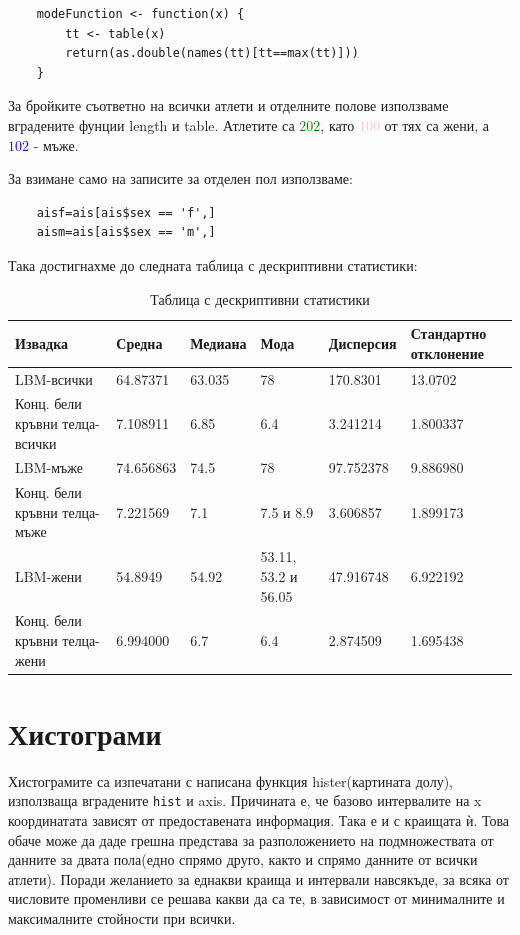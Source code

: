 \documentclass[12pt]{article}
\begin{document}
\begin{large}
\begin{verbatim}
	modeFunction <- function(x) {
		tt <- table(x)
		return(as.double(names(tt)[tt==max(tt)]))
	}
\end{verbatim}

За бройките съответно на всички атлети и отделните полове използваме вградените фунции length и table. Атлетите са \textcolor{green}{$202$}, като \textcolor{pink}{$100$} от тях са жени, а \textcolor{blue}{$102$} - мъже.

За взимане само на записите за отделен пол използваме:
\begin{verbatim}
	aisf=ais[ais$sex == 'f',]
	aism=ais[ais$sex == 'm',]
\end{verbatim}
Така достигнахме до следната таблица с дескриптивни статистики:
\clearpage

\begin{table}
\centering
\begin{tabular}{ |L{3cm}|L{2.4cm}|L{2.4cm}|L{2.4cm}|L{2.4cm}|L{2.4cm}|  }
 \hline 
 Извадка & Средна & Медиана & Мода  & Дисперсия & Стандартно отклонение\\
 \hline \hline
 LBM-всички & 64.87371 & 63.035 & 78 & 170.8301 & 13.0702 \\
 \hline
 Конц. бели кръвни телца-всички & 7.108911 & 6.85 & 6.4 & 3.241214 & 1.800337 \\
 \hline
 LBM-мъже & 74.656863 & 74.5 & 78 & 97.752378 & 9.886980 \\
 \hline
 Конц. бели кръвни телца-мъже & 7.221569 & 7.1 & 7.5 и 8.9 & 3.606857 & 1.899173 \\
 \hline
 LBM-жени & 54.8949 & 54.92 & 53.11, 53.2 и 56.05 & 47.916748 & 6.922192 \\
 \hline
 Конц. бели кръвни телца-жени & 6.994000 & 6.7 & 6.4 & 2.874509 & 1.695438 \\
 \hline
\end{tabular}
\caption{Таблица с дескриптивни статистики}
\end{table}

\section{Хистограми}
Хистограмите са изпечатани с написана функция hister(картината долу), използваща вградените \texttt{hist} и axis. Причината е, че базово интервалите на x координатата зависят от предоставената информация. Така е и с краищата ѝ. Това обаче може да даде грешна представа за разположението на подмножествата от данните за двата пола(едно спрямо друго, както и спрямо данните от всички атлети). Поради желанието за еднакви краища и интервали навсякъде, за всяка от числовите променливи се решава какви да са те, в зависимост от минималните и максималните стойности при всички. 


\end{large}
\end{document}

